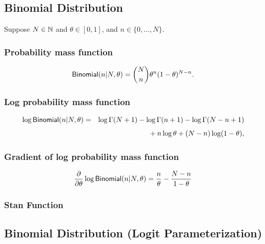 \subsection{Binomial Distribution}

Suppose $N \in \mathbb{N}$ and $\theta \in [0,1]$, and $n \in
\{0,\ldots,N\}$.  

\subsubsection{Probability mass function}
\[
\mbox{\sf Binomial}(n|N,\theta)
= {N \choose n} \theta^n (1 - \theta)^{N - n}.
\]

\subsubsection{Log probability mass function}
%
\begin{eqnarray*}
\log \mbox{\sf Binomial}(n|N,\theta)
& = &
\log \Gamma(N+1) - \log \Gamma(n + 1) - \log \Gamma(N- n + 1)
\\[4pt]
& & { } + n \log \theta + (N - n) \log (1 - \theta), 
\end{eqnarray*}
%
\subsubsection{Gradient of log probability mass function}
%
\[
\frac{\partial}{\partial \theta} \log \mbox{\sf Binomial}(n|N,\theta)
= \frac{n}{\theta}
- \frac{N - n}{1 - \theta}
\]
\subsubsection{Stan Function}
%
\begin{description}
%
%

\end{description}


\subsection{Binomial Distribution (Logit Parameterization)}


